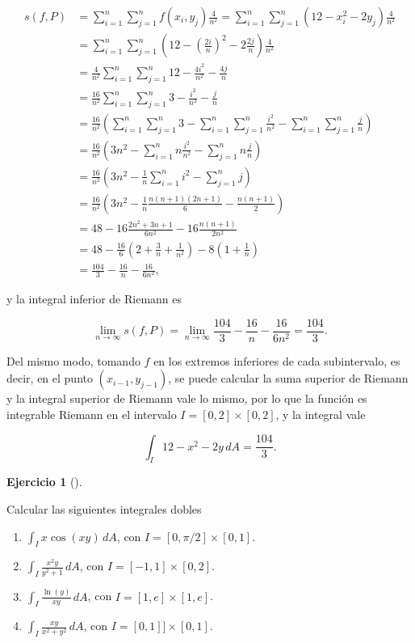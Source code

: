 \documentclass[
  a4paper,
]{scrreport}
\theoremstyle{definition}
\newtheorem{exercise}{Ejercicio}[chapter]
\theoremstyle{remark}
\begin{document}
\begin{tcolorbox}
\begin{align*}
s(f,P) 
&= \sum_{i=1}^n\sum_{j=1}^n f(x_i,y_j) \frac{4}{n^2}
= \sum_{i=1}^n\sum_{j=1}^n (12-x_i^2-2y_j) \frac{4}{n^2} \\
&= \sum_{i=1}^n\sum_{j=1}^n \left(12-\left(\frac{2i}{n}\right)^2-2\frac{2j}{n}\right) \frac{4}{n^2} \\
&= \frac{4}{n^2} \sum_{i=1}^n\sum_{j=1}^n 12-\frac{4i^2}{n^2}-\frac{4j}{n} \\
&= \frac{16}{n^2} \sum_{i=1}^n\sum_{j=1}^n 3-\frac{i^2}{n^2}-\frac{j}{n} \\
&= \frac{16}{n^2} \left(\sum_{i=1}^n\sum_{j=1}^n 3- \sum_{i=1}^n\sum_{j=1}^n \frac{i^2}{n^2}- \sum_{i=1}^n\sum_{j=1}^n \frac{j}{n}\right) \\
&= \frac{16}{n^2} \left(3n^2 - \sum_{i=1}^n n\frac{i^2}{n^2} - \sum_{j=1}^n n\frac{j}{n}\right) \\
&= \frac{16}{n^2} \left(3n^2 - \frac{1}{n}\sum_{i=1}^n i^2 - \sum_{j=1}^n j\right) \\
&= \frac{16}{n^2} \left(3n^2 - \frac{1}{n}\frac{n(n+1)(2n+1)}{6} - \frac{n(n+1)}{2}\right) \\
&= 48 - 16\frac{2n^2+3n+1}{6n^2} - 16\frac{n(n+1)}{2n^2} \\
&= 48 - \frac{16}{6}\left(2 +\frac{3}{n}+\frac{1}{n^2}\right) - 8\left(1+\frac{1}{n}\right) \\
&= \frac{104}{3} -\frac{16}{n} -\frac{16}{6n^2},
\end{align*}

y la integral inferior de Riemann es

\[
\lim_{n\to\infty} s(f,P)
= \lim_{n\to\infty} \frac{104}{3} -\frac{16}{n} -\frac{16}{6n^2}
= \frac{104}{3}.
\]

Del mismo modo, tomando \(f\) en los extremos inferiores de cada
subintervalo, es decir, en el punto \((x_{i-1},y_{j-1})\), se puede
calcular la suma superior de Riemann y la integral superior de Riemann
vale lo mismo, por lo que la función es integrable Riemann en el
intervalo \(I=[0,2]\times[0,2]\), y la integral vale

\[
\int_I 12-x^2-2y\,dA = \frac{104}{3}.
\]

\end{tcolorbox}

\begin{exercise}[]\protect\hypertarget{exr-integrales-dobles}{}\label{exr-integrales-dobles}

Calcular las siguientes integrales dobles

\begin{enumerate}
\def\labelenumi{\alph{enumi}.}
\item
  \(\int_I x\cos(xy)\,dA\), con \(I=[0,\pi/2]\times[0,1]\).
\item
  \(\int_I \frac{x^2y}{y^2+1}\,dA\), con \(I=[-1,1]\times[0,2]\).
\item
  \(\int_I \frac{\ln(y)}{xy}\,dA\), con \(I=[1,e]\times[1,e]\).
\item
  \(\int_I \frac{xy}{x^2+y^2}\,dA\), con \(I=[0,1]]\times[0,1]\).
\end{enumerate}

\end{exercise}
\end{document}
